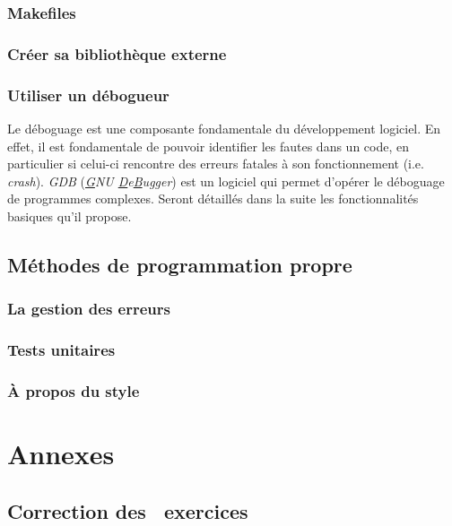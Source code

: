\documentclass{minitelreport}
\newcounter{exercisescounter}
\begin{document}
\begin{refsection}
		\section{Makefiles}
		
		\section{Créer sa bibliothèque externe}
		\section{Utiliser un débogueur}
		Le déboguage est une composante fondamentale du développement logiciel. En effet, il est fondamentale de pouvoir identifier les fautes dans un code, en particulier si celui-ci rencontre des erreurs fatales à son fonctionnement (i.e. \textit{crash}). \textit{GDB} (\textit{\underline{G}NU \underline{D}e\underline{B}ugger}) est un logiciel qui permet d'opérer le déboguage de programmes complexes. Seront détaillés dans la suite les fonctionnalités basiques qu'il propose.
	\chapter{Méthodes de programmation propre}
		\section{La gestion des erreurs}
		
		\section{Tests unitaires}
		
		\section{À propos du style}
		
\part{Annexes}
\chapter{Correction des \theexercisescounter\ exercices}
	
\printbibheading
\printbibliography[type=book,heading=subbibliography,title={Livres}]
\printbibliography[type=manual, heading=subbibliography, title={Manuels et documentation}]
\printbibliography[type=online, heading=subbibliography, title={Autres liens}]
\end{refsection}
\end{document}
